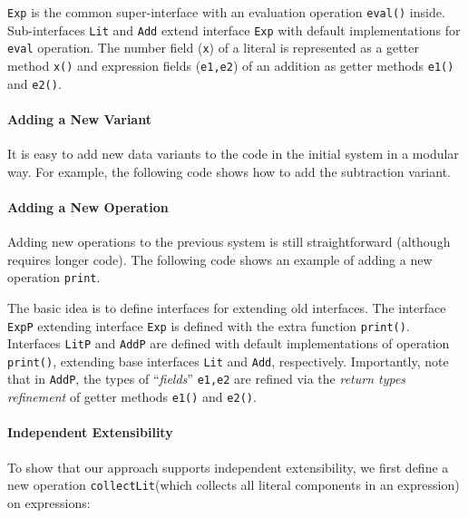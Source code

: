 
\texttt{Exp} is the common super-interface with an evaluation operation
\texttt{eval()} inside. Sub-interfaces \texttt{Lit} and \texttt{Add} extend
interface \texttt{Exp} with default implementations for \texttt{eval}
operation. The number field (\texttt{x}) of a literal is represented as a getter
method \texttt{x()} and expression fields (\texttt{e1,e2}) of an addition as
getter methods \texttt{e1()} and \texttt{e2()}.

\paragraph{Adding a New Variant}
It is easy to add new data variants to the code in the initial system in a
modular way. For example, the following code shows how to add the subtraction
variant.



\paragraph{Adding a New Operation}
Adding new operations to the previous system is still straightforward (although
requires longer code). The following code shows an example of adding a new
operation \texttt{print}.


The basic idea is to define interfaces for extending old interfaces.  The
interface \texttt{ExpP} extending interface \texttt{Exp} is defined with the
extra function \texttt{print()}. Interfaces \texttt{LitP} and \texttt{AddP} are
defined with default implementations of operation \texttt{print()}, extending
base interfaces \texttt{Lit} and \texttt{Add}, respectively. Importantly, note
that in \texttt{AddP}, the types of ``\emph{fields}'' \texttt{e1,e2} are refined
via the \emph{return types refinement} of getter methods \texttt{e1()} and
\texttt{e2()}.

\paragraph{Independent Extensibility}
To show that our approach supports independent extensibility, we first define a
new operation \texttt{collectLit}(which collects all
literal components in an expression) on expressions: 

